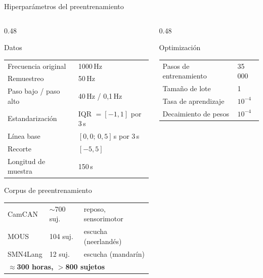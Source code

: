 \documentclass[aspectratio=169,10pt]{beamer}
\begin{document}
\begin{frame}[c]{Hiperparámetros del preentrenamiento}
  \small
  \begin{columns}[t,totalwidth=\linewidth]
    \begin{column}{0.48\linewidth}
      \begin{block}{Datos}
        \footnotesize
        \begin{tabular}{@{}ll@{}}
          \toprule
          Frecuencia original & 1000\,Hz \\
          Remuestreo & 50\,Hz \\
          Paso bajo / paso alto & 40\,Hz / 0,1\,Hz \\
          Estandarización & IQR $=[-1,1]$ por 3\,s \\
          Línea base & $[0{,}0;\,0{,}5]$\,s por 3\,s \\
          Recorte & $[-5,5]$ \\
          Longitud de muestra & 150\,s \\
          \bottomrule
        \end{tabular}
      \end{block}
      \begin{block}{Corpus de preentrenamiento}
        \footnotesize
        \begin{tabular}{@{}lll@{}}
          \toprule
          CamCAN & $\sim$700 suj. & reposo, sensorimotor \\
          MOUS & 104 suj. & escucha (neerlandés) \\
          SMN4Lang & 12 suj. & escucha (mandarín) \\
          \midrule
          \multicolumn{3}{l}{\textbf{$\approx$300 horas, $>$800 sujetos}} \\
          \bottomrule
        \end{tabular}
      \end{block}
    \end{column}
    \begin{column}{0.48\linewidth}
      \begin{block}{Optimización}
        \footnotesize
        \begin{tabular}{@{}ll@{}}
          \toprule
          Pasos de entrenamiento & 35\,000 \\
          Tamaño de lote & 1 \\
          Tasa de aprendizaje & $10^{-4}$ \\
          Decaimiento de pesos & $10^{-4}$ \\

\end{tabular}
\end{block}
\end{column}
\end{columns}
\end{frame}
\end{document}
